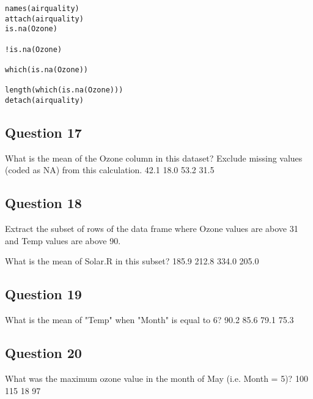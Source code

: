 \documentclass[12pt]{article}
\begin{document}
\begin{framed}
\begin{verbatim}
names(airquality)
attach(airquality)
is.na(Ozone)

!is.na(Ozone)

which(is.na(Ozone))

length(which(is.na(Ozone)))
detach(airquality)
\end{verbatim}
\end{framed}
\newpage
\subsection*{Question 17}
\Large
What is the mean of the Ozone column in this dataset? Exclude missing values (coded as NA) from this calculation.
42.1
18.0
53.2
31.5

\newpage
\subsection*{Question 18}
\Large
Extract the subset of rows of the data frame where Ozone values are above 31 and Temp values are above 90. 

What is the mean of Solar.R in this subset?
185.9
212.8
334.0
205.0

\newpage
\subsection*{Question 19}
\Large
What is the mean of "Temp" when "Month" is equal to 6?
90.2
85.6
79.1
75.3


\subsection*{Question 20}
\Large
What was the maximum ozone value in the month of May (i.e. Month = 5)?
100
115
18
97

\end{document}

